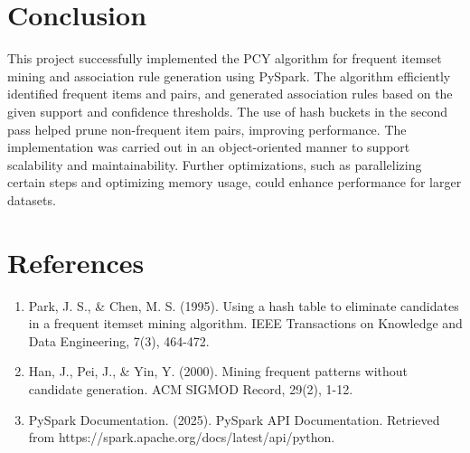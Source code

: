 \documentclass{article}
\begin{document}
\section{Conclusion}
This project successfully implemented the PCY algorithm for frequent itemset mining and association rule generation using PySpark. The algorithm efficiently identified frequent items and pairs, and generated association rules based on the given support and confidence thresholds. The use of hash buckets in the second pass helped prune non-frequent item pairs, improving performance. The implementation was carried out in an object-oriented manner to support scalability and maintainability. Further optimizations, such as parallelizing certain steps and optimizing memory usage, could enhance performance for larger datasets.

\section{References}
\begin{enumerate}
    \item Park, J. S., & Chen, M. S. (1995). Using a hash table to eliminate candidates in a frequent itemset mining algorithm. IEEE Transactions on Knowledge and Data Engineering, 7(3), 464-472.
    \item Han, J., Pei, J., & Yin, Y. (2000). Mining frequent patterns without candidate generation. ACM SIGMOD Record, 29(2), 1-12.
    \item PySpark Documentation. (2025). PySpark API Documentation. Retrieved from https://spark.apache.org/docs/latest/api/python.
\end{enumerate}
\end{document}
